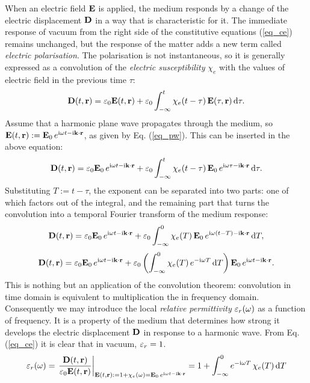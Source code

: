 When an electric field $\mathbf{E}$ is applied, the medium responds by a change of the electric displacement $\mathbf{D}$ in a way that is characteristic for it. 
The immediate response of vacuum from the right side of the constitutive equations (\ref{eq_ce}) remains unchanged, but the response of the matter adds a new term called \textit{electric polarisation}. The polarisation is not instantaneous, so it is generally expressed as a convolution of the \textit{electric susceptibility} $\chi_e$ with the values of electric field in the previous time $\tau$:
\begin{equation} \mathbf{D}(t,{\mathbf{r}}) = \varepsilon_0 \mathbf{E}(t,{\mathbf{r}}) + \varepsilon_0 \int_{-\infty}^{t}\chi_e(t-\tau)\, \mathbf{E}(\tau,{\mathbf{r}})\,\mbox{d}\tau. \label{eq_loc_chi_convol}\end{equation}
Assume that a harmonic plane wave propagates through the medium, so $\mathbf{E}(t, {\mathbf{r}}) := \mathbf{E}_0 \, e^{{\mathrm i}\omega t - {\mathrm i}{\mathbf{k}}\cdot{\mathbf{r}}}$, as given by Eq. (\ref{eq_pw}). This can be inserted in the above equation:
\begin{equation} \mathbf{D}(t,{\mathbf{r}}) = \varepsilon_0 \mathbf{E}_0 \, e^{{\mathrm i}\omega t - {\mathrm i}{\mathbf{k}}\cdot{\mathbf{r}}} + \varepsilon_0 \int_{-\infty}^{t} \chi_e(t-\tau) \, \mathbf{E}_0 \, e^{{\mathrm i}\omega \tau - {\mathrm i}{\mathbf{k}}\cdot{\mathbf{r}}} \,\mbox{d}\tau. \label{eq_chi_convol_harm}\end{equation}
Substituting $T:=t-\tau$, the exponent can be separated into two parts: one of which factors out of the integral, and the remaining part that turns the convolution into a temporal Fourier transform of the medium response:
$$				 \mathbf{D}(t,{\mathbf{r}}) = \varepsilon_0 \mathbf{E}_0 \, e^{{\mathrm i}\omega t - {\mathrm i}{\mathbf{k}}\cdot{\mathbf{r}}} + \varepsilon_0 \int_{-\infty}^{0} \chi_e(T) \, \mathbf{E}_0 \, e^{{\mathrm i}\omega (t - T) - {\mathrm i}{\mathbf{k}}\cdot{\mathbf{r}}} \,\mbox{d}T,$$
$$				 \mathbf{D}(t,{\mathbf{r}}) = \varepsilon_0 \mathbf{E}_0 \, e^{{\mathrm i}\omega t - {\mathrm i}{\mathbf{k}}\cdot{\mathbf{r}}} + \varepsilon_0 \left( \int_{-\infty}^{0} \chi_e(T)  \, e^{-{\mathrm i}\omega T}\,\mbox{d}T  \right) \mathbf{E}_0 \, e^{{\mathrm i}\omega t - {\mathrm i}{\mathbf{k}}\cdot{\mathbf{r}}}.$$
This is nothing but an application of the convolution theorem: convolution in time domain is equivalent to multiplication the in frequency domain.  %
Consequently we may introduce the local \textit{relative permittivity} $\varepsilon_r(\omega)$ as a function of frequency. It is a property of the medium that determines how strong it develops the electric displacement $\mathbf{D}$ in response to a harmonic wave. From Eq. (\ref{eq_ce}) it is clear that in vacuum,  $\varepsilon_r = 1$.
\begin{equation}  \varepsilon_r(\omega) = \left.\frac{\mathbf{D}(t,{\mathbf{r}})}{\varepsilon_0 \mathbf{E}(t,{\mathbf{r}})} \right|_{\mathbf{E}(t, {\mathbf{r}}) := 1 + \chi_e(\omega) = \mathbf{E}_0 \, e^{{\mathrm i}\omega t - {\mathrm i}{\mathbf{k}}\cdot{\mathbf{r}}}} = 1 + \int_{-\infty}^{0} e^{-{\mathrm i}\omega T} \,\chi_e(T) \,\mbox{d}T \label{eq_eps_loc}\end{equation}
